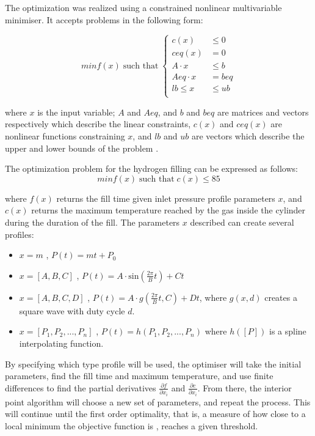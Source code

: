 The optimization was realized using a constrained nonlinear multivariable minimiser. It accepts problems in the following form:

\begin{equation}
min f(x) \; \text{such that} \;
  \begin{cases}
	 c(x)              & \leq 0      \\
	ceq(x)           & =     0      \\
	A \cdot x       & \leq b       \\
	Aeq \cdot x   & =     beq  \\
	lb \leq          x & \leq ub  \\
  \end{cases}
\end{equation}

\noindent where $x$ is the input variable; $A$ and $Aeq$, and  $b$ and $beq$ are matrices and vectors respectively which describe the linear constraints, $c(x)$ and $ceq(x)$ are nonlinear functions constraining $x$, and $lb$ and $ub$ are vectors which describe the upper and lower bounds of the problem \cite{fmincon}.

The optimization problem for the hydrogen filling can be expressed as follows:
\begin{equation}
min f(x)  \; \text{such that} \; c(x) \leq 85
\end{equation}

\noindent where $f(x)$ returns the fill time given inlet pressure profile parameters $x$, and $c(x)$ returns the maximum temperature reached by the gas inside the cylinder during the duration of the fill. The parameters $x$ described can create several profiles:

\begin{itemize}
\item $ x = m $ , $ P(t) = mt + P_0$ 
\item $ x = [A, B, C] $ , $P(t) = A \cdot \text{sin}\left(\frac{2 \pi}{B} t\right) + Ct$
\item $ x = [A, B, C,D] $ , $P(t) = A \cdot g\left(\frac{2 \pi}{B} t, C\right) + Dt$, where $g(x,d)$ creates a square wave with duty cycle $d$.
\item $ x = \left[P_1, P_2, ..., P_n\right] $ , $P(t) = h\left(P_1, P_2, ..., P_n\right)$ where $h([P])$ is a spline interpolating function.
\end{itemize}

\noindent By specifying which type profile will be used, the optimiser will take the initial parameters, find the fill time and maximum temperature, and use finite differences to find the partial derivatives $\frac{\partial f}{\partial x_i}$ and $\frac{\partial c}{\partial x_i}$. From there, the interior point algorithm \cite{interiorPoint} will choose a new set of parameters, and repeat the process. This will continue until the first order optimality, that is, a measure of how close to a local minimum the objective function is \cite{firstOrderOpt}, reaches a given threshold.




